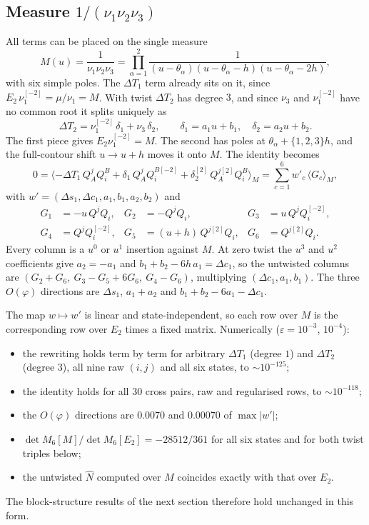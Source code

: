 \documentclass[11pt]{article}
\newcommand{\sh}[1]{^{[#1]}}
\newcommand{\br}[1]{\langle #1\rangle}
\begin{document}
\subsection{Measure $1/(\nu_1\nu_2\nu_3)$}
All terms can be placed on the single measure
\begin{equation}
M(u)=\frac{1}{\nu_1\nu_2\nu_3}=\prod_{\alpha=1}^2\frac{1}{(u-\theta_\alpha)(u-\theta_\alpha-h)(u-\theta_\alpha-2h)},
\end{equation}
with six simple poles. The $\Delta T_1$ term already sits on it, since $E_2\,\nu_1\sh{-2}=\mu/\nu_1=M$.
With twist $\Delta T_2$ has degree $3$, and since $\nu_3$ and $\nu_1\sh{-2}$ have no common root it
splits uniquely as
\begin{equation}
\Delta T_2=\nu_1\sh{-2}\,\delta_1+\nu_3\,\delta_2,\qquad \delta_1=a_1u+b_1,\quad \delta_2=a_2u+b_2 .
\end{equation}
The first piece gives $E_2\nu_1\sh{-2}=M$. The second has poles at $\theta_\alpha+\{1,2,3\}h$, and the
full-contour shift $u\to u+h$ moves it onto $M$. The identity becomes
\begin{equation}
0=\br{-\Delta T_1\,Q^j_AQ^B_i+\delta_1\,Q^j_AQ_i^{B[-2]}+\delta_2\sh{2}\,Q^{j[2]}_AQ^B_i}_M
=\sum_{c=1}^6 w'_c\,\br{G_c}_M,
\end{equation}
with $w'=(\Delta s_1,\Delta c_1,a_1,b_1,a_2,b_2)$ and
\begin{equation}
\begin{aligned}
G_1&=-u\,Q^jQ_i, & G_2&=-Q^jQ_i, & G_3&=u\,Q^jQ_i\sh{-2},\\
G_4&=Q^jQ_i\sh{-2}, & G_5&=(u+h)\,Q^{j[2]}Q_i, & G_6&=Q^{j[2]}Q_i .
\end{aligned}
\end{equation}
Every column is a $u^0$ or $u^1$ insertion against $M$. At zero twist the $u^3$ and $u^2$
coefficients give $a_2=-a_1$ and $b_1+b_2-6h\,a_1=\Delta c_1$, so the untwisted columns are
$(G_2+G_6,\ G_3-G_5+6G_6,\ G_4-G_6)$, multiplying $(\Delta c_1,a_1,b_1)$. The three $O(\varphi)$
directions are $\Delta s_1$, $a_1+a_2$ and $b_1+b_2-6a_1-\Delta c_1$.

The map $w\mapsto w'$ is linear and state-independent, so each row over $M$ is the corresponding row
over $E_2$ times a fixed matrix. Numerically ($\varepsilon=10^{-3}$, $10^{-4}$):
\begin{itemize}
\item the rewriting holds term by term for arbitrary $\Delta T_1$ (degree $1$) and $\Delta T_2$
(degree $3$), all nine raw $(i,j)$ and all six states, to $\sim10^{-125}$;
\item the identity holds for all $30$ cross pairs, raw and regularised rows, to $\sim10^{-118}$;
\item the $O(\varphi)$ directions are $0.0070$ and $0.00070$ of $\max|w'|$;
\item $\det M_6[M]/\det M_6[E_2]=-28512/361$ for all six states and for both twist triples below;
\item the untwisted $\widehat N$ computed over $M$ coincides exactly with that over $E_2$.
\end{itemize}
The block-structure results of the next section therefore hold unchanged in this form.
\end{document}
